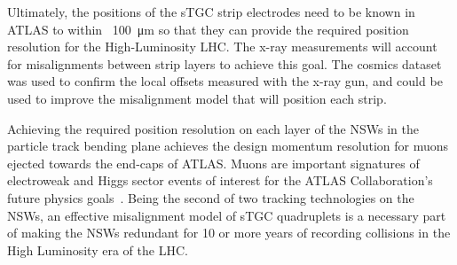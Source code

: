 Ultimately, the positions of the sTGC strip electrodes need to be known in ATLAS to within ~\SI{100}{\micro\meter} so that they can provide the required position resolution for the High-Luminosity LHC. The x-ray measurements will account for misalignments between strip layers to achieve this goal. The cosmics dataset was used to confirm the local offsets measured with the x-ray gun, and could be used to improve the misalignment model that will position each strip.

Achieving the required position resolution on each layer of the NSWs in the particle track bending plane achieves the design momentum resolution for muons ejected towards the end-caps of ATLAS. Muons are important signatures of electroweak and Higgs sector events of interest for the ATLAS Collaboration's future physics goals~\cite{nsw_tdr}. Being the second of two tracking technologies on the NSWs, an effective misalignment model of sTGC quadruplets is a necessary part of making the NSWs redundant for 10 or more years of recording collisions in the High Luminosity era of the LHC. 